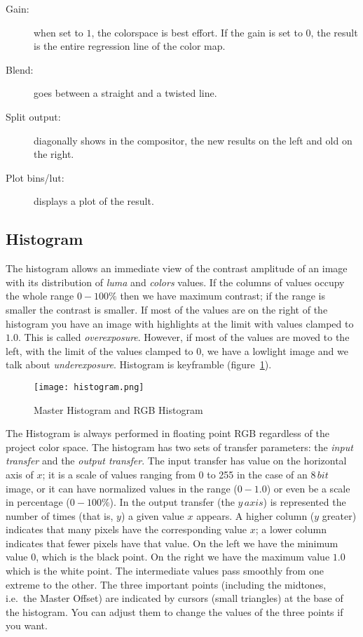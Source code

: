 \begin{description}
    \item[Gain:] when set to $1$, the colorspace is best effort. If the gain is set to $0$, the result is the entire regression line of the color map.
    \item[Blend:] goes between a straight and a twisted line.
    \item[Split output:] diagonally shows in the compositor, the new results on the left and old on the right.
    \item[Plot bins/lut:] displays a plot of the result.
\end{description}

\subsection{Histogram}%
\label{sub:histogram}

The histogram allows an immediate view of the contrast amplitude of an image with its distribution of \textit{luma} and \textit{colors} values. If the columns of values occupy the whole range $0-100\%$ then we have maximum contrast; if the range is smaller the contrast is smaller. If most of the values are on the right of the histogram you have an image with highlights at the limit with values clamped to $1.0$. This is called \textit{overexposure}. However, if most of the values are moved to the left, with the limit of the values clamped to $0$, we have a lowlight image and we talk about \textit{underexposure}. Histogram is keyframble (figure~\ref{fig:histogram}).

\begin{figure}[htpb]
    \centering
    \texttt{[image: histogram.png]}
    \caption{Master Histogram and RGB Histogram}
    \label{fig:histogram}
\end{figure}

The Histogram is always performed in floating point RGB regardless of the project color space. The histogram has two sets of transfer parameters: the \textit{input transfer} and the \textit{output transfer}. The input transfer has value on the horizontal axis of $x$; it is a scale of values ranging from 0 to 255 in the case of an $8\,bit$ image, or it can have normalized values in the range ($0-1.0$) or even be a scale in percentage ($0-100\%$). In the output transfer (the $y\,axis$) is represented the number of times (that is, $y$) a given value $x$ appears. A higher column ($y$ greater) indicates that many pixels have the corresponding value $x$; a lower column indicates that fewer pixels have that value. On the left we have the minimum value $0$, which is the black point. On the right we have the maximum value $1.0$ which is the white point. The intermediate values pass smoothly from one extreme to the other. The three important points (including the midtones, i.e.\ the Master Offset) are indicated by cursors (small triangles) at the base of the histogram. You can adjust them to change the values of the three points if you want.

